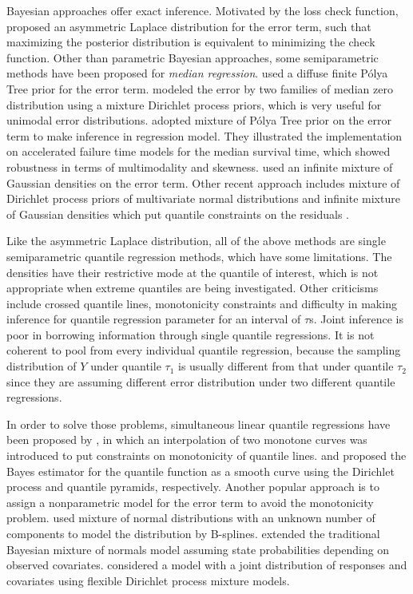 \documentclass[12pt]{article}
\newcommand{\polya}{P\'{o}lya}
\begin{document}
Bayesian approaches offer exact inference. Motivated by the loss check
function, \citet{yu2001} proposed an asymmetric Laplace distribution
for the error term, such that maximizing the posterior distribution is
equivalent to minimizing the check function. Other than parametric
Bayesian approaches, some semiparametric methods have been proposed
for {\em median regression}. \citet{walker1999} used a diffuse finite
\polya{} Tree prior for the error term. \citet{kottas2001} modeled the
error by two families of median zero distribution using a mixture
Dirichlet process priors, which is very useful for unimodal error
distributions. \citet{hanson2002} adopted mixture of \polya{} Tree
prior on the error term to make inference in regression model. They
illustrated the implementation on accelerated failure time models for the median survival
time, which showed robustness in terms of multimodality
and skewness.  \citet{reich2010} used an infinite mixture of Gaussian
densities on the error term.
Other recent approach includes mixture of Dirichlet process priors of multivariate normal distributions and infinite mixture of Gaussian densities which put quantile constraints on the residuals \citep{kottas2009}.

Like the asymmetric Laplace distribution, all of the above methods are single semiparametric quantile regression methods, which have some limitations.
The densities have their restrictive mode at the quantile of interest, which is not appropriate when extreme quantiles are being investigated.
Other criticisms include crossed quantile lines, monotonicity constraints and difficulty in making inference for quantile regression parameter for an interval of $\tau$s.
Joint inference is poor in borrowing information through single quantile regressions.
It is not coherent to pool from every individual quantile regression, because the sampling distribution of $Y$ under quantile $\tau_1$ is usually different from that under quantile $\tau_2$ since they are assuming different error distribution under two different quantile regressions.

In order to solve those problems, simultaneous linear quantile regressions have been proposed by \citet{tokdar2011},
in which an interpolation of two monotone curves was introduced to put constraints on monotonicity of quantile lines.
\citet{hjort2007} and \citet{hjort2009} proposed the Bayes estimator for the quantile function as a smooth curve using the Dirichlet process and quantile pyramids, respectively.
Another popular approach is to assign a nonparametric model for the error term to
avoid the monotonicity problem.
\citet{scaccia2003} used mixture of normal distributions with an unknown number of components to model the distribution by B-splines.
\citet{geweke2007} extended the traditional Bayesian mixture of normals model assuming state probabilities depending on observed covariates.
\citet{taddy2010} considered a model with a joint distribution of responses and covariates using flexible Dirichlet process mixture models.
\end{document}
